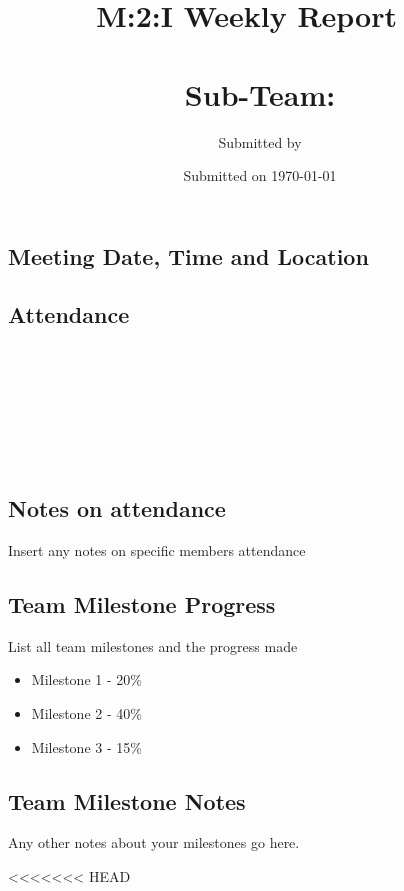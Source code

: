 \documentclass[10pt,a4paper]{article}
\author{Submitted by \teamLeader}
\title{M:2:I Weekly Report \ \\ \teamName \ \\ Sub-Team: \subteamName}
\date{Submitted on \today}
\begin{document}
\maketitle

\begin{Form}
\begin{framed}
\section*{Meeting Date, Time and Location}
\TextField[name=meetinginfo,width=9cm,charsize=12pt]
{\mbox{}}
\end{framed}
\begin{framed}
\section*{Attendance}
 \ \\ \ \\
\TextField[name=attend2,width=16.85cm,charsize=12pt]\ \\ \ \\
 \ \\ \ \\
\subsection*{Notes on attendance}
Insert any notes on specific members attendance
\end{framed}
\begin{framed}
\section*{Team Milestone Progress}
List all team milestones and the progress made
\begin{itemize}
\item Milestone 1 - 20\%
\item Milestone 2 - 40\%
\item Milestone 3 - 15\%
\end{itemize}
\subsection*{Team Milestone Notes}
Any other notes about your milestones go here.
\end{framed}
<<<<<<< HEAD
\begin{framed}

\end{framed}
\end{Form}
\end{document}
